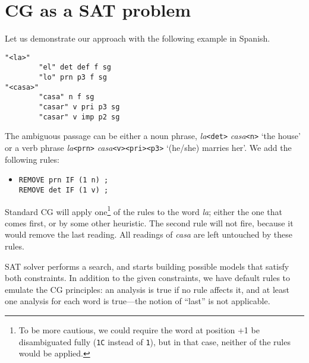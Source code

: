 \documentclass[11pt]{article}
\begin{document}


\section{CG as a SAT problem}
Let us demonstrate our approach with the following example in Spanish.

\begin{verbatim}
"<la>"
        "el" det def f sg
        "lo" prn p3 f sg
"<casa>"
        "casa" n f sg
        "casar" v pri p3 sg
        "casar" v imp p2 sg
\end{verbatim}

The ambiguous passage can be either a noun phrase, \emph{la}\texttt{<det>} \emph{casa}\texttt{<n>} 
`the house'  or a verb phrase \emph{la}\texttt{<prn>}  \emph{casa}\texttt{<v><pri><p3>} `(he/she) marries her'. 
We add the following rules:

\begin{itemize}
\item [] \texttt{REMOVE prn IF (1 n) ;} \\
             \texttt{REMOVE det IF (1 v) ;}
\end{itemize}

Standard CG will apply one\footnote{To be more cautious, we could require the word at position +1 be disambiguated fully (\texttt{1C} instead of \texttt{1}), but in that case, 
neither of the rules would be applied.} of the rules to the word \emph{la}; 
either the one that comes first, or by some other heuristic. 
The second rule will not fire, because it would remove the last reading. 
All readings of \emph{casa} are left untouched by these rules.

SAT solver performs a search, 
and starts building possible models that satisfy both constraints. 
In addition to the given constraints, we have default rules to emulate
the CG principles: an analysis is true if no rule affects it,
and at least one analysis for each word is true---the notion of
``last'' is not applicable.
\end{document}
